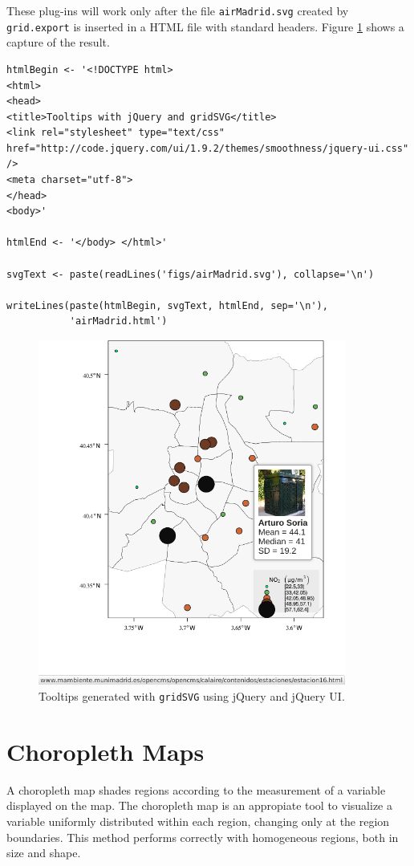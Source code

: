 \documentclass[smallroyalvopaper]{memoir}
\begin{document}
These plug-ins will work only after the file \texttt{airMadrid.svg} created by
\texttt{grid.export} is inserted in a HTML file with standard headers. Figure
\ref{fig:airMadridTooltip} shows a capture of the result.

\lstset{language=R,numbers=none}
\begin{lstlisting}
htmlBegin <- '<!DOCTYPE html>
<html>
<head>
<title>Tooltips with jQuery and gridSVG</title>
<link rel="stylesheet" type="text/css" href="http://code.jquery.com/ui/1.9.2/themes/smoothness/jquery-ui.css" />
<meta charset="utf-8">
</head>
<body>'

htmlEnd <- '</body> </html>'

svgText <- paste(readLines('figs/airMadrid.svg'), collapse='\n')

writeLines(paste(htmlBegin, svgText, htmlEnd, sep='\n'),
           'airMadrid.html')
\end{lstlisting}



\begin{figure}
\includegraphics[width=0.9\textwidth]{figs/airMadridTooltip.png}
\caption{\label{fig:airMadridTooltip}Tooltips generated with \texttt{gridSVG} using jQuery and jQuery UI.}
\end{figure}
\section{Choropleth Maps}
\label{sec-1}
\label{sec:multiChoropleth}
A choropleth map shades regions according to the measurement of a
variable displayed on the map. The choropleth map is an appropiate
tool to visualize a variable uniformly distributed within each
region, changing only at the region boundaries. This method
performs correctly with homogeneous regions, both in size and
shape.  
\end{document}
